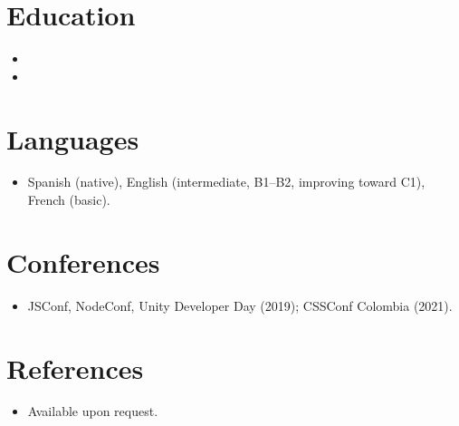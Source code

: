 \documentclass[11pt,a4paper,sans]{moderncv}
\begin{document}
\section{Education}
\vspace{1pt}
\begin{itemize}

\item{}

\vspace{3pt}

\item{}

\end{itemize}


\section{Languages}
\vspace{1pt}
\begin{itemize}
\item Spanish (native), English (intermediate, B1--B2, improving toward C1), French (basic).
\end{itemize}


\section{Conferences}
\vspace{1pt}
\begin{itemize}
\item JSConf, NodeConf, Unity Developer Day (2019); CSSConf Colombia (2021).
\end{itemize}


\section{References}
\vspace{1pt}
\begin{itemize}
\item{Available upon request.}
\end{itemize}
\end{document}

